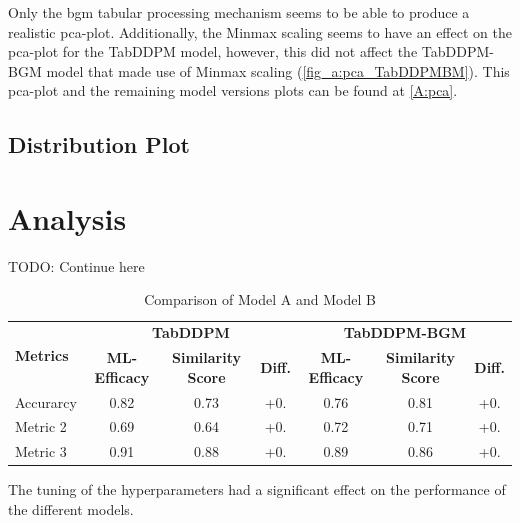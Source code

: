 Only the \gls{bgm} tabular processing mechanism seems to be able to produce a realistic \gls{pca}-plot.
Additionally, the Minmax scaling seems to have an effect on the \gls{pca}-plot for the TabDDPM model, however,
this did not affect the TabDDPM-BGM model that made use of Minmax scaling (\autoref{fig_a:pca_TabDDPMBM}).
This \gls{pca}-plot and the remaining model versions plots can be found at \autoref{A:pca}.

\subsection[]{Distribution Plot}
\label{ch:results-Distr}





\section{Analysis}
\label{ch:results-analysis}


TODO: Continue here
\begin{table}[h]
	\centering
	\caption{Comparison of Model A and Model B}
	\label{tab:model-comparison}
	\begin{tabular}{|l|ccc|ccc|}
		\toprule
		\multirow{2}{*}{\textbf{Metrics}} & \multicolumn{3}{c|}{\textbf{TabDDPM}} & \multicolumn{3}{c|}{\textbf{TabDDPM-BGM}}                                                                                      \\ \cline{2-7}
		                                  & \textbf{ML-Efficacy}                  & \textbf{Similarity Score}                 & \textbf{Diff.} & \textbf{ML-Efficacy} & \textbf{Similarity Score} & \textbf{Diff.} \\
		\midrule
		\multicolumn{1}{|l|}{Accurarcy}   & 0.82                                  & 0.73                                      & +0.            & 0.76                 & 0.81                      & +0.            \\
		\multicolumn{1}{|l|}{Metric 2}    & 0.69                                  & 0.64                                      & +0.            & 0.72                 & 0.71                      & +0.            \\
		\multicolumn{1}{|l|}{Metric 3}    & 0.91                                  & 0.88                                      & +0.            & 0.89                 & 0.86                      & +0.            \\
		\bottomrule
	\end{tabular}
\end{table}



The tuning of the hyperparameters had a significant effect on the performance of the different models.


